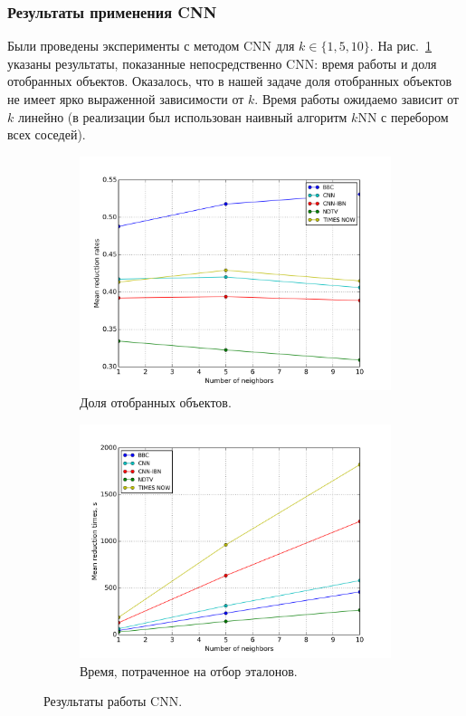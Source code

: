 \subsubsection*{Результаты применения CNN}
Были проведены эксперименты с методом CNN для \(k\in\{1, 5, 10\}\). На рис.~\ref{fig:cnn-stats} указаны результаты, показанные непосредственно CNN: время работы и доля отобранных объектов. Оказалось, что в нашей задаче доля отобранных объектов не имеет ярко выраженной зависимости от \(k\). Время работы ожидаемо зависит от \(k\) линейно (в реализации был использован наивный алгоритм \(k\)NN с перебором всех соседей).

\begin{figure}[h!]
    \centering
	\begin{subfigure}{0.45\textwidth}
		\includegraphics[width=\textwidth]{images/cnn-stats.png}
		\caption{Доля отобранных объектов.}
	\end{subfigure}
	\begin{subfigure}{0.45\textwidth}
		\includegraphics[width=\textwidth]{images/cnn-TimeStats.png}
		\caption{Время, потраченное на отбор эталонов.}
	\end{subfigure}
	\caption{Результаты работы CNN.}\label{fig:cnn-stats}
\end{figure}


